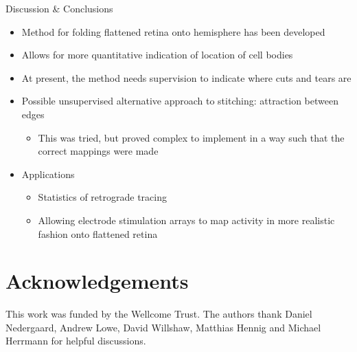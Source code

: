 \documentclass{article}
\newcommand{\frametitle}[1]{{\vspace{0.1in}\color{blue}\Huge #1}\\\vspace{0.2in}}
\renewenvironment{frame}{\pagebreak[4]\LARGE

}{}
\begin{document}
\begin{frame}
\frametitle{Discussion \& Conclusions}

\begin{itemize}
\item Method for folding flattened retina onto hemisphere has been developed
\item Allows for more quantitative indication of location of  cell bodies 
\item At present, the method needs supervision to indicate where cuts
  and tears are
\item Possible unsupervised alternative approach to stitching:
  attraction between edges
  \begin{itemize}
  \item This was tried, but proved complex to implement in a way such that the
    correct mappings were made
  \end{itemize}
\item Applications
  \begin{itemize}
  \item Statistics of retrograde tracing
  \item Allowing electrode stimulation arrays to map  activity in more
    realistic fashion onto flattened retina
  \end{itemize}
\end{itemize}

\vfill

\section*{Acknowledgements}

\large

This work was funded by the Wellcome Trust. The authors thank Daniel
Nedergaard, Andrew Lowe, David Willshaw, Matthias Hennig and Michael
Herrmann for helpful discussions.



\large



\end{frame}
\end{document}
